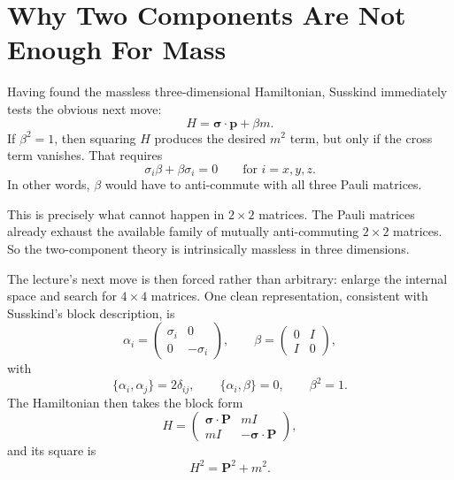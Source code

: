 \section{Why Two Components Are Not Enough For Mass}

Having found the massless three-dimensional Hamiltonian, Susskind immediately tests the obvious next move:
\begin{equation}
H=\boldsymbol{\sigma}\cdot\mathbf p+\beta m.
\end{equation}
If \(\beta^2=1\), then squaring \(H\) produces the desired \(m^2\) term, but only if the cross term vanishes. That requires
\begin{equation}
\sigma_i\beta+\beta\sigma_i=0
\qquad
\text{for } i=x,y,z.
\end{equation}
In other words, \(\beta\) would have to anti-commute with all three Pauli matrices.

This is precisely what cannot happen in \(2\times2\) matrices. The Pauli matrices already exhaust the available family of mutually anti-commuting \(2\times2\) matrices. So the two-component theory is intrinsically massless in three dimensions.

The lecture's next move is then forced rather than arbitrary: enlarge the internal space and search for \(4\times4\) matrices. One clean representation, consistent with Susskind's block description, is
\begin{equation}
\alpha_i=
\begin{pmatrix}
\sigma_i&0\\
0&-\sigma_i
\end{pmatrix},
\qquad
\beta=
\begin{pmatrix}
0&I\\
I&0
\end{pmatrix},
\end{equation}
with
\begin{equation}
\{\alpha_i,\alpha_j\}=2\delta_{ij},
\qquad
\{\alpha_i,\beta\}=0,
\qquad
\beta^2=1.
\end{equation}
The Hamiltonian then takes the block form
\begin{equation}
H=
\begin{pmatrix}
\boldsymbol{\sigma}\cdot\mathbf P & mI\\
mI & -\boldsymbol{\sigma}\cdot\mathbf P
\end{pmatrix},
\end{equation}
and its square is
\begin{equation}
H^2=\mathbf P^2+m^2.
\end{equation}

